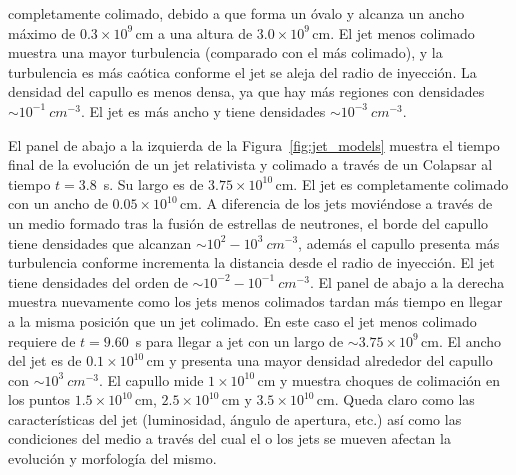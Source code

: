 \documentclass[12pt,a4paper]{book}
\begin{document}
completamente colimado, debido a que forma un óvalo y alcanza un ancho máximo de $0.3 \times 10^9 \, \text{cm}$ a una altura de $3.0 \times 10^9 \, \text{cm}$. El jet menos colimado muestra una mayor 
turbulencia (comparado con el más colimado), y la turbulencia es más caótica conforme el jet se aleja del radio de inyección. La densidad del capullo es menos densa, ya que hay más regiones con densidades 
$\sim 10^{-1} ~cm^{-3}$. El jet es más ancho y tiene densidades $\sim 10^{-3} ~cm^{-3}$.


El panel de abajo a la izquierda de la Figura~\ref{fig:jet_models} muestra el tiempo final de la evolución de un jet relativista y colimado a través de un Colapsar al tiempo $t = 3.8$~s. Su largo es de
$3.75 \times 10^{10} \, \text{cm}$. El jet es completamente colimado con un ancho de $0.05 \times 10^{10} \, \text{cm}$. A diferencia de los jets moviéndose a través de un medio formado tras la fusión de estrellas de 
neutrones, el borde del capullo tiene densidades que alcanzan $\sim10^{2}-10^{3} ~cm^{-3}$, además el capullo presenta más turbulencia conforme incrementa la distancia desde el radio de inyección. El jet tiene densidades 
del orden de $\sim 10^{-2}-10^{-1} ~cm^{-3}$. El panel de abajo a la derecha muestra nuevamente como los jets menos colimados tardan más tiempo en llegar a la misma posición que un jet colimado. En este caso el jet menos 
colimado requiere de $t = 9.60$~s para llegar a jet con un largo de $\sim 3.75 \times 10^9 \, \text{cm}$. El ancho del jet es de $0.1 \times 10^{10} \, \text{cm}$ y presenta una mayor densidad alrededor
del capullo con $\sim10^{3} ~cm^{-3}$. El capullo mide $1 \times 10^{10} \, \text{cm}$ y muestra choques de colimación en los puntos $1.5 \times 10^{10} \, \text{cm}$, $2.5 \times 10^{10} \, \text{cm}$ 
y $3.5 \times 10^{10} \, \text{cm}$. Queda claro como las características del jet (luminosidad, ángulo de apertura, etc.) así como las condiciones del medio a través del cual el o los jets se mueven afectan la 
evolución y morfología del mismo.
\end{document}
